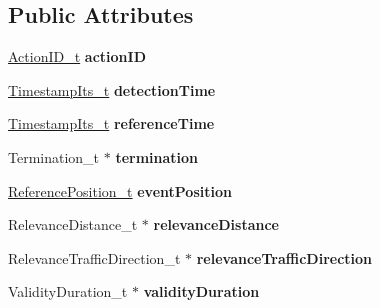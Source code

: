 \subsection*{Public Attributes}
\begin{DoxyCompactItemize}
\item 
\hyperlink{structActionID}{Action\+I\+D\+\_\+t} {\bfseries action\+ID}\hypertarget{structManagementContainer_aecdf2b8501ad791a1d7daddcc6997c3a}{}\label{structManagementContainer_aecdf2b8501ad791a1d7daddcc6997c3a}

\item 
\hyperlink{structASN____PRIMITIVE__TYPE__s}{Timestamp\+Its\+\_\+t} {\bfseries detection\+Time}\hypertarget{structManagementContainer_a35a394368dd6ec30aa395d2d346078d1}{}\label{structManagementContainer_a35a394368dd6ec30aa395d2d346078d1}

\item 
\hyperlink{structASN____PRIMITIVE__TYPE__s}{Timestamp\+Its\+\_\+t} {\bfseries reference\+Time}\hypertarget{structManagementContainer_a2ce95dbfa0a8efdbdf748effa35bf1b1}{}\label{structManagementContainer_a2ce95dbfa0a8efdbdf748effa35bf1b1}

\item 
Termination\+\_\+t $\ast$ {\bfseries termination}\hypertarget{structManagementContainer_a31f91964a6494945f06db53ee07a323f}{}\label{structManagementContainer_a31f91964a6494945f06db53ee07a323f}

\item 
\hyperlink{structReferencePosition}{Reference\+Position\+\_\+t} {\bfseries event\+Position}\hypertarget{structManagementContainer_a82c99f581270a64183b50713e89d004f}{}\label{structManagementContainer_a82c99f581270a64183b50713e89d004f}

\item 
Relevance\+Distance\+\_\+t $\ast$ {\bfseries relevance\+Distance}\hypertarget{structManagementContainer_a9fea0c43e789fbbac723e7b6910509b8}{}\label{structManagementContainer_a9fea0c43e789fbbac723e7b6910509b8}

\item 
Relevance\+Traffic\+Direction\+\_\+t $\ast$ {\bfseries relevance\+Traffic\+Direction}\hypertarget{structManagementContainer_af333501b5a4b445876af075216b5d982}{}\label{structManagementContainer_af333501b5a4b445876af075216b5d982}

\item 
Validity\+Duration\+\_\+t $\ast$ {\bfseries validity\+Duration}\hypertarget{structManagementContainer_a471d8141087aa67e69f7a6945e313677}{}\label{structManagementContainer_a471d8141087aa67e69f7a6945e313677}


\end{DoxyCompactItemize}
